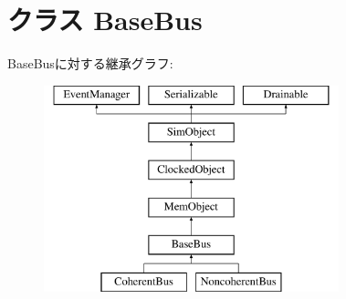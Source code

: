 \hypertarget{classBus_1_1BaseBus}{
\section{クラス BaseBus}
\label{classBus_1_1BaseBus}
}
BaseBusに対する継承グラフ:\begin{figure}[H]
\begin{center}
\leavevmode
\includegraphics[height=6cm]{classBus_1_1BaseBus}
\end{center}
\end{figure}

